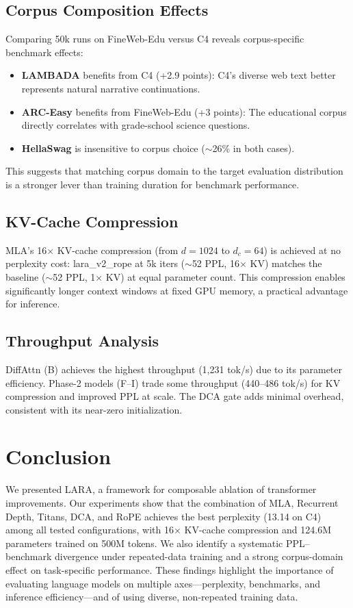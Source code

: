 \documentclass{article}
\begin{document}
\subsection{Corpus Composition Effects}

Comparing 50k runs on FineWeb-Edu versus C4 reveals corpus-specific benchmark effects:
\begin{itemize}
  \item \textbf{LAMBADA} benefits from C4 (+2.9 points): C4's diverse web text better represents natural narrative continuations.
  \item \textbf{ARC-Easy} benefits from FineWeb-Edu (+3 points): The educational corpus directly correlates with grade-school science questions.
  \item \textbf{HellaSwag} is insensitive to corpus choice ($\sim$26\% in both cases).
\end{itemize}
This suggests that matching corpus domain to the target evaluation distribution is a stronger lever than training duration for benchmark performance.

\subsection{KV-Cache Compression}

MLA's 16$\times$ KV-cache compression (from $d=1024$ to $d_c=64$) is achieved at no perplexity cost: lara\_v2\_rope at 5k iters ($\sim$52 PPL, 16$\times$ KV) matches the baseline ($\sim$52 PPL, 1$\times$ KV) at equal parameter count. This compression enables significantly longer context windows at fixed GPU memory, a practical advantage for inference.

\subsection{Throughput Analysis}

DiffAttn (B) achieves the highest throughput (1{,}231 tok/s) due to its parameter efficiency. Phase-2 models (F–I) trade some throughput (440–486 tok/s) for KV compression and improved PPL at scale. The DCA gate adds minimal overhead, consistent with its near-zero initialization.

\section{Conclusion}

We presented LARA, a framework for composable ablation of transformer improvements. Our experiments show that the combination of MLA, Recurrent Depth, Titans, DCA, and RoPE achieves the best perplexity (13.14 on C4) among all tested configurations, with 16$\times$ KV-cache compression and 124.6M parameters trained on 500M tokens. We also identify a systematic PPL–benchmark divergence under repeated-data training and a strong corpus-domain effect on task-specific performance. These findings highlight the importance of evaluating language models on multiple axes—perplexity, benchmarks, and inference efficiency—and of using diverse, non-repeated training data.
\end{document}
